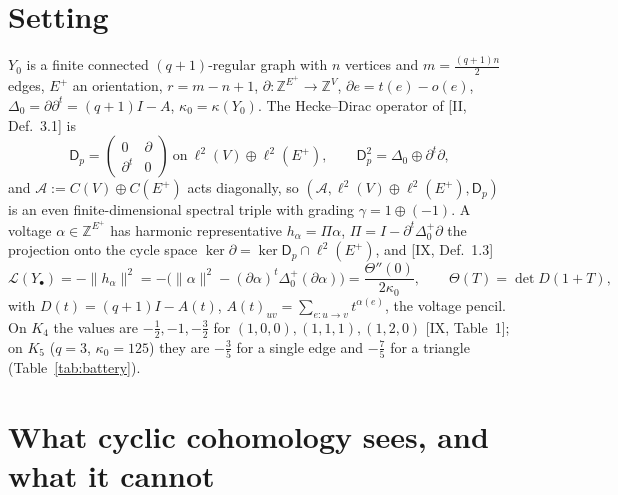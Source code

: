 \documentclass[11pt]{amsart}
\numberwithin{equation}{section}
\theoremstyle{definition}
\theoremstyle{remark}
\newcommand{\Z}{\mathbb{Z}}
\newcommand{\cA}{\mathcal{A}}
\newcommand{\cL}{\mathcal{L}}
\newcommand{\Dp}{\mathsf{D}_p}
\begin{document}
\section{Setting}\label{sec:setting}

$Y_0$ is a finite connected $(q{+}1)$-regular graph with $n$ vertices and $m=\frac{(q+1)n}2$
edges, $E^{+}$ an orientation, $r=m-n+1$, $\partial\colon\Z^{E^{+}}\to\Z^{V}$,
$\partial e=t(e)-o(e)$, $\Delta_0=\partial\partial^{t}=(q{+}1)I-A$, $\kappa_0=\kappa(Y_0)$.
The Hecke--Dirac operator of [II, Def.~3.1] is
\[
\Dp=\begin{pmatrix}0&\partial\\\partial^{t}&0\end{pmatrix}\ \text{on}\
\ell^{2}(V)\oplus\ell^{2}(E^{+}),\qquad
\Dp^{2}=\Delta_0\oplus\partial^{t}\partial ,
\]
and $\cA:=C(V)\oplus C(E^{+})$ acts diagonally, so $(\cA,\ell^{2}(V)\oplus\ell^{2}(E^{+}),\Dp)$
is an even finite-dimensional spectral triple with grading $\gamma=1\oplus(-1)$. A voltage
$\alpha\in\Z^{E^{+}}$ has harmonic representative $h_\alpha=\Pi\alpha$,
$\Pi=I-\partial^{t}\Delta_0^{+}\partial$ the projection onto the cycle space
$\ker\partial=\ker\Dp\cap\ell^{2}(E^{+})$, and [IX, Def.~1.3]
\[
\cL(Y_\bullet)=-\|h_\alpha\|^{2}=-\bigl(\|\alpha\|^{2}-(\partial\alpha)^{t}\Delta_0^{+}(\partial\alpha)\bigr)
=\frac{\Theta''(0)}{2\kappa_0},\qquad \Theta(T)=\det D(1+T),
\]
with $D(t)=(q{+}1)I-A(t)$, $A(t)_{uv}=\sum_{e\colon u\to v}t^{\alpha(e)}$, the voltage
pencil. On $K_4$ the values are $-\frac12,-1,-\frac32$ for $(1,0,0),(1,1,1),(1,2,0)$
[IX, Table~1]; on $K_5$ ($q=3$, $\kappa_0=125$) they are $-\frac35$ for a single edge and
$-\frac75$ for a triangle (Table~\ref{tab:battery}).

\section{What cyclic cohomology sees, and what it cannot}\label{sec:nogo}
\end{document}
